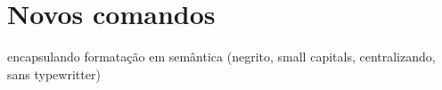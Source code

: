 \section{Novos comandos}

encapsulando formatação em semântica (negrito, small capitals,
centralizando, sans  typewritter)

